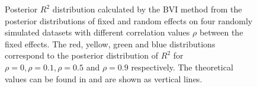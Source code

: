 \begin{figure}[H]
  \centering
  \hfill
  \caption{Posterior $R^2$ distribution calculated by the BVI method from the posterior distributions of fixed and random effects on four randomly simulated datasets with different correlation values $\rho$ between the fixed effects. The red, yellow, green and blue distributions correspond to the posterior distribution of $R^2$ for $\rho=0, \rho=0.1, \rho=0.5$ and $\rho=0.9$ respectively. The theoretical values can be found in  and are shown as vertical lines.}
  \label{fig:R2}
\end{figure}



